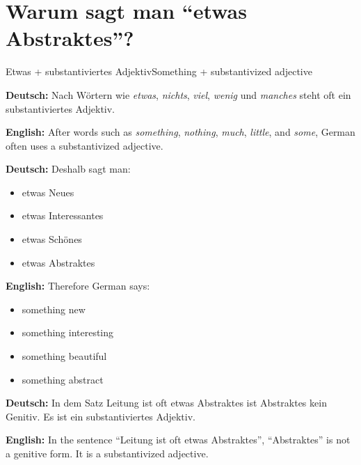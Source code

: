 \documentclass[a4paper,11pt]{article}
\newcommand{\GermanText}[1]{\textbf{Deutsch: }#1\par}
\newcommand{\EnglishText}[1]{{\small\color{SoftGray}\textbf{English: }#1\par}}
\begin{document}
    
    \section{Warum sagt man ``etwas Abstraktes''?}
        
        \begin{grammarentry}{Etwas + substantiviertes Adjektiv}{Something + substantivized adjective}
            
            \GermanText{
                Nach W\"ortern wie \textit{etwas}, \textit{nichts}, \textit{viel}, \textit{wenig} und \textit{manches}
                steht oft ein substantiviertes Adjektiv.
            }
            
            \EnglishText{
                After words such as \textit{something}, \textit{nothing}, \textit{much},
                \textit{little}, and \textit{some}, German often uses a substantivized adjective.
            }
            
            \GermanText{
                Deshalb sagt man:
                \begin{itemize}
                    \item etwas Neues
                    \item etwas Interessantes
                    \item etwas Sch\"ones
                    \item etwas Abstraktes
                \end{itemize}
            }
            
            \EnglishText{
                Therefore German says:
                \begin{itemize}
                    \item something new
                    \item something interesting
                    \item something beautiful
                    \item something abstract
                \end{itemize}
            }
            
            \GermanText{
                In dem Satz \glqq Leitung ist oft etwas Abstraktes\grqq{}
                ist \glqq Abstraktes\grqq{} kein Genitiv.
                Es ist ein substantiviertes Adjektiv.
            }
            
            \EnglishText{
                In the sentence ``Leitung ist oft etwas Abstraktes'',
                ``Abstraktes'' is not a genitive form.
                It is a substantivized adjective.
            }
        
        \end{grammarentry}
    
\end{document}
